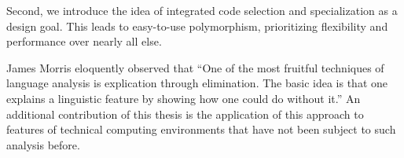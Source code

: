 
Second, we introduce the idea of integrated code selection and specialization
as a design goal. This leads to easy-to-use polymorphism, prioritizing
flexibility and performance over nearly all else.




James Morris eloquently observed that
``One of the most fruitful techniques of language analysis is explication through
elimination. The basic idea is that one explains a linguistic feature by showing
how one could do without it.'' \cite{morris}
An additional contribution of this thesis is the application of this approach to features
of technical computing environments that have not been subject to such analysis
before.
